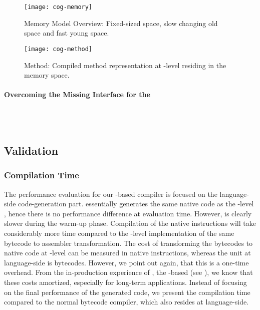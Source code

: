 \begin{figure}[h]
	\centering
	\texttt{[image: cog-memory]}
	\caption[\Cog Memory Model Overview]{\Cog Memory Model Overview: Fixed-sized \JIT space, slow changing old space and fast young space.}
\end{figure}

\begin{figure}[h]
	\centering
	\texttt{[image: cog-method]}
	\caption[\Cog Method]{\Cog Method: Compiled method representation at \JIT-level residing in the \JIT memory space.}
\end{figure}

\paragraph{Overcoming the Missing \VM Interface for the \JIT}
\\
\\

\subsection{Validation}


\subsubsection*{Compilation Time}


The performance evaluation for our \B-based \JIT compiler is focused on the language-side code-generation part.
\NBJ essentially generates the same native code as the \VM-level \JIT, hence there is no performance difference at evaluation time.
However, \NBJ is clearly slower during the warm-up phase.
Compilation of the native instructions will take considerably more time compared to the \VM-level implementation of the same bytecode to assembler transformation.
The cost of transforming the bytecodes to native code at \VM-level can be measured in native instructions, whereas the unit at language-side is bytecodes.
However, we point out again, that this is a one-time overhead.
From the in-production experience of \NB, the \B-based \FFI (see ), we know that these costs amortized, especially for long-term applications.
Instead of focusing on the final performance of the generated code, we present the compilation time compared to the normal \PH bytecode compiler, which also resides at language-side.

